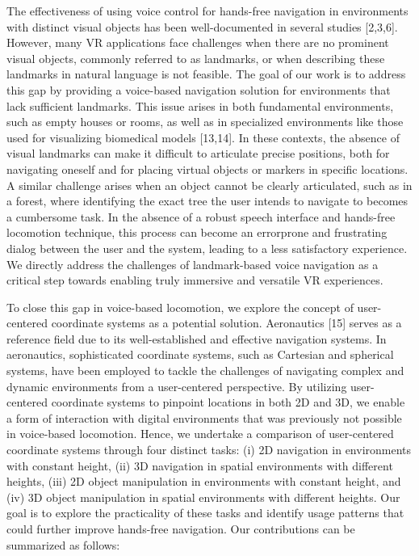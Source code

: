\documentclass[preprint,12pt]{elsarticle}
\newcommand{\reftext}[1]{{\color{gray}#1}}   %
\begin{document}
\reftext{The effectiveness of using voice control for hands-free navigation in environments with distinct visual objects has been well-documented in several studies [2,3,6]. However, many VR applications face challenges when there are no prominent visual objects, commonly referred to as landmarks, or when describing these landmarks in natural language is not feasible. The goal of our work is to address this gap by providing a voice-based navigation solution for environments that lack sufficient landmarks. This issue arises in both fundamental environments, such as empty houses or rooms, as well as in specialized environments like those used for visualizing biomedical models [13,14]. In these contexts, the absence of visual landmarks can make it difficult to articulate precise positions, both for navigating oneself and for placing virtual objects or markers in specific locations. A similar challenge arises when an object cannot be clearly articulated, such as in a forest, where identifying the exact tree the user intends to navigate to becomes a cumbersome task. In the absence of a robust speech interface and hands-free locomotion technique, this process can become an errorprone and frustrating dialog between the user and the system, leading to a less satisfactory experience. We directly address the challenges of landmark-based voice navigation as a critical step towards enabling truly immersive and versatile VR experiences.}

\reftext{To close this gap in voice-based locomotion, we explore the concept of user-centered coordinate systems as a potential solution. Aeronautics [15] serves as a reference field due to its well-established and effective navigation systems. In aeronautics, sophisticated coordinate systems, such as Cartesian and spherical systems, have been employed to tackle the challenges of navigating complex and dynamic environments from a user-centered perspective. By utilizing user-centered coordinate systems to pinpoint locations in both 2D and 3D, we enable a form of interaction with digital environments that was previously not possible in voice-based locomotion. Hence, we undertake a comparison of user-centered coordinate systems through four distinct tasks: (i) 2D navigation in environments with constant height, (ii) 3D navigation in spatial environments with different heights, (iii) 2D object manipulation in environments with constant height, and (iv) 3D object manipulation in spatial environments with different heights. Our goal is to explore the practicality of these tasks and identify usage patterns that could further improve hands-free navigation. Our contributions can be summarized as follows:}
\end{document}
